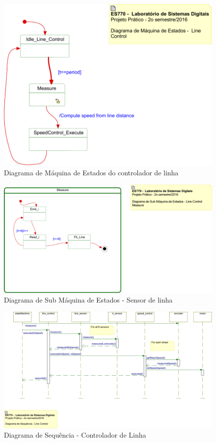 \documentclass{article}
\begin{document}
\begin{figure}[H]
	\centering
	\includegraphics[width=0.9\linewidth]{stateLine}
	\caption{Diagrama de Máquina de Estados do controlador de linha}
	\label{fig:stateLine}
\end{figure}
\begin{figure}[H]
	\centering
	\includegraphics[width=0.9\linewidth]{stateLineMeasure}
	\caption{Diagrama de Sub Máquina de Estados - Sensor de linha}
	\label{fig:lineMeasure}
\end{figure}
\begin{figure}[H]
	\centering
	\includegraphics[width=0.9\linewidth]{line}
	\caption{Diagrama de Sequência - Controlador de Linha}
	\label{fig:line}
\end{figure}
\end{document}
